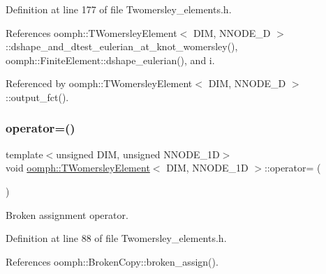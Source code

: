 Definition at line 177 of file Twomersley\+\_\+elements.\+h.



References oomph\+::\+T\+Womersley\+Element$<$ D\+I\+M, N\+N\+O\+D\+E\+\_\+D $>$\+::dshape\+\_\+and\+\_\+dtest\+\_\+eulerian\+\_\+at\+\_\+knot\+\_\+womersley(), oomph\+::\+Finite\+Element\+::dshape\+\_\+eulerian(), and i.



Referenced by oomph\+::\+T\+Womersley\+Element$<$ D\+I\+M, N\+N\+O\+D\+E\+\_\+D $>$\+::output\+\_\+fct().

\mbox{\label{classoomph_1_1TWomersleyElement_a5df99cc667253edc774b3a32cc2a4e7a}} 
\subsubsection{\texorpdfstring{operator=()}{operator=()}}
{\footnotesize\ttfamily template$<$unsigned D\+IM, unsigned N\+N\+O\+D\+E\+\_\+1D$>$ \\
void \hyperlink{classoomph_1_1TWomersleyElement}{oomph\+::\+T\+Womersley\+Element}$<$ D\+IM, N\+N\+O\+D\+E\+\_\+1D $>$\+::operator= (\begin{DoxyParamCaption}\item[{const \hyperlink{classoomph_1_1TWomersleyElement}{T\+Womersley\+Element}$<$ D\+IM, N\+N\+O\+D\+E\+\_\+1D $>$ \&}]{ }\end{DoxyParamCaption})\hspace{0.3cm}{\ttfamily [inline]}}



Broken assignment operator. 



Definition at line 88 of file Twomersley\+\_\+elements.\+h.



References oomph\+::\+Broken\+Copy\+::broken\+\_\+assign().

\mbox{\label{classoomph_1_1TWomersleyElement_a8f98e2f615c46e68737600059820ac96}} 
